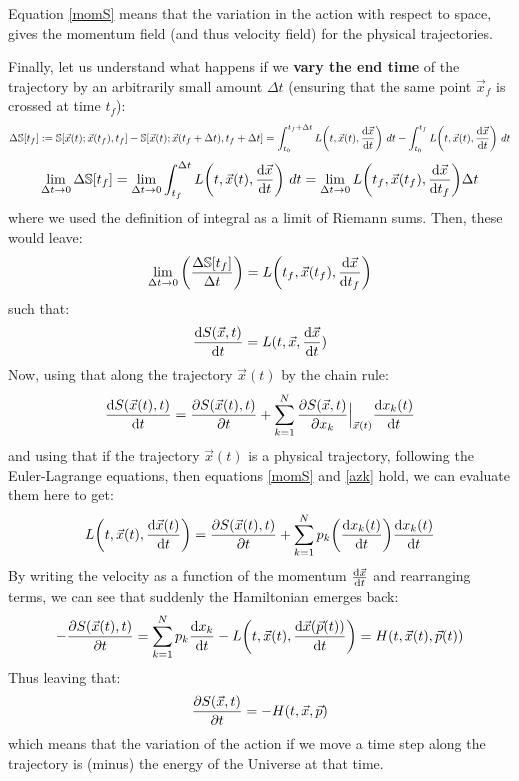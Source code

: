 \documentclass[11pt, a4paper]{article} %
\newcommand{\s}{\mathbb{S}}
\begin{document}
Equation \eqref{momS} means that the variation in the action with respect to space, gives the momentum field (and thus velocity field) for the physical trajectories.

Finally, let us understand what happens if we {\bf vary the end time} of the trajectory by an arbitrarily small amount $\Delta t$ (ensuring that the same point $\vec{x}_f$ is crossed at time $t_f$):
\begin{equation}
\Delta \s[t_f]:=\s[\vec{x}(t); \vec{x}(t_f),t_f]-\s[\vec{x}(t); \vec{x}(t_f+\Delta t), t_f+\Delta t]=\int_{t_0}^{t_f+\Delta t} L\qty(t, \vec{x}(t), \dv{\vec{x}}{t})\ dt - \int_{t_0}^{t_f} L\qty(t, \vec{x}(t), \dv{\vec{x}}{t})\ dt
\end{equation}
$$
\lim_{\Delta t\rightarrow 0}\Delta \s[t_f]= \lim_{\Delta t\rightarrow 0}\int_{t_f}^{\Delta t} L\qty(t, \vec{x}(t), \dv{\vec{x}}{t})\ dt=\lim_{\Delta t\rightarrow 0}  L\qty(t_f, \vec{x}(t_f), \dv{\vec{x}}{t_f})\Delta t
$$
where we used the definition of integral as a limit of Riemann sums. Then, these would leave:
\begin{equation}
\lim_{\Delta t\rightarrow 0}\qty(\frac{\Delta \s[t_f]}{\Delta t} )= L\qty(t_f, \vec{x}(t_f), \dv{\vec{x}}{t_f})
\end{equation}
such that:
\begin{equation}\label{azk}
\dv{S(\vec{x},t)}{t}=L(t,\vec{x},\dv{\vec{x}}{t})
\end{equation}
Now, using that along the trajectory $\vec{x}(t)$ by the chain rule:
\begin{equation}
\dv{S(\vec{x}(t),t)}{t} = \pdv{S(\vec{x}(t),t)}{t}+\sum_{k=1}^N\pdv{S(\vec{x},t)}{x_k}\Big\rvert_{\vec{x}(t)}\dv{x_k(t)}{t}
\end{equation}
and using that if the trajectory $\vec{x}(t)$ is a physical trajectory, following the Euler-Lagrange equations, then equations \eqref{momS} and \eqref{azk} hold, we can evaluate them here to get:
\begin{equation}
L\qty(t, \vec{x}(t), \dv{\vec{x}(t)}{t})=\pdv{S(\vec{x}(t),t)}{t}+\sum_{k=1}^N p_k\qty(\dv{x_k(t)}{t})\dv{x_k(t)}{t}
\end{equation}
By writing the velocity as a function of the momentum $\dv{\vec{x}}{t} (\vec{p})$ and rearranging terms, we can see that suddenly the Hamiltonian emerges back:
\begin{equation}
-\pdv{S(\vec{x}(t),t)}{t}=\sum_{k=1}^N p_k\dv{x_k}{t} (p_k(t))-L\qty(t, \vec{x}(t), \dv{\vec{x}(\vec{p}(t))}{t})=H(t, \vec{x}(t), \vec{p}(t))
\end{equation}
Thus leaving that:
\begin{equation}\label{hamS}
\pdv{S(\vec{x},t)}{t}=-H(t, \vec{x}, \vec{p})
\end{equation}
which means that the variation of the action if we move a time step along the trajectory is (minus) the energy of the Universe at that time.
\end{document}
